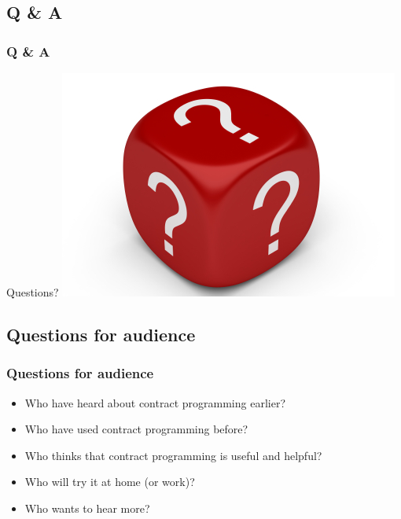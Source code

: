 \documentclass{beamer}
\begin{document}
\subsection{Q \& A}
\begin{frame}
\frametitle{Q \& A}
\begin{center}
\Huge Questions?
\includegraphics[scale=0.45]{dice_questions}
\end{center}
\end{frame}


\subsection{Questions for audience}
\begin{frame}
\frametitle{Questions for audience}
\begin{itemize}[<+->]
  \item Who have heard about contract programming earlier?
  \item Who have used contract programming before?
  \item Who thinks that contract programming is useful and helpful?
  \item Who will try it at home (or work)?
  \item Who wants to hear more?
\end{itemize}
\end{frame}
\end{document}
